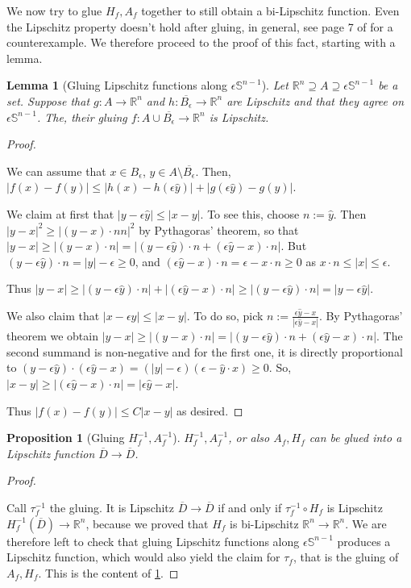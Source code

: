 \documentclass[english,a4paper,9pt,oneside]{scrbook}	%
\theoremstyle{break}
\newtheorem{lemma}[equation]{Lemma}
\newtheorem{prop}[equation]{Proposition}
\newenvironment{mproof}[1][\proofname]{%
  \begin{proof}[#1]$ $\par\nobreak\ignorespaces
}{%
  \end{proof}
}
\renewcommand*{\proofname}{Proof}
\theoremstyle{remark}
\newcommand{\mR}{\mathbb{R}}
\newcommand{\mS}{\mathbb{S}^{n-1}}
\newcommand{\yh}{\hat{y}}
\newcommand{\eps}{\epsilon}
\begin{document}
We now try to glue $H_f, A_f$ together to still obtain a bi-Lipschitz function. Even the Lipschitz property doesn't hold after gluing, in general, see page 7 of \cite{weaver} for a counterexample. We therefore proceed to the proof of this fact, starting with a lemma.

\begin{lemma}[Gluing Lipschitz functions along $\eps \mS$]
\label{lemma:gluing_lip}
Let $\mR^n \supseteq A\supseteq\eps \mS$ be a set. Suppose that $g:A\rightarrow\mR^n$ and $h:\overline{B_\eps}\rightarrow\mR^n$ are Lipschitz and that they agree on $\eps \mS$. The, their gluing $f: A \cup \overline{B_\eps}\rightarrow\mR^n$ is Lipschitz.
\end{lemma}

\begin{mproof}
We can assume that $x \in B_\eps$, $y \in A \setminus \overline{B_\eps}$.
Then, $|f(x)-f(y)|\leq |h(x)-h(\eps \yh)|+|g(\eps \yh)-g(y)|$.

We claim at first that $|y-\eps \yh|\leq  |x-y|$. To see this, choose $n:=\yh$. Then $|y-x|^2 \geq |(y-x)\cdot n n|^2$ by Pythagoras' theorem, so that $|y-x|\geq |(y-x)\cdot n| = |(y-\eps \yh)\cdot n + (\eps \yh -x)\cdot n|$. But $(y-\eps \yh)\cdot n=|y|-\eps \geq 0$, and $(\eps \yh -x)\cdot n = \eps - x\cdot n\geq 0 $ as $x\cdot n \leq |x|\leq \eps$.

Thus  $|y-x|\geq |(y-\eps \yh)\cdot n| + |(\eps \yh -x)\cdot n|\geq  |(y-\eps \yh)\cdot n|=|y-\eps \yh|$.

We also claim that $|x-\eps \yh|\leq |x-y|$. To do so, pick $n:=\frac{\eps\yh -x}{|\eps\yh-x|}$. By Pythagoras' theorem we obtain $|y-x|\geq |(y-x)\cdot n|=|(y-\eps \yh)\cdot n +(\eps \yh -x)\cdot n|$. The second summand is non-negative and for the first one, it is directly proportional to $(y-\eps \yh)\cdot(\eps \yh-x)=(|y|-\eps)(\eps-\yh\cdot x)\geq 0$. So, $|x-y|\geq |(\eps \yh -x)\cdot n|=|\eps \yh -x|$.

Thus $ |f(x)-f(y)|\leq C|x-y|$ as desired.
\end{mproof}

\begin{prop}[Gluing $H_f^{-1}, A_f^{-1}$]
\label{prop:gluing}
$H_f^{-1}, A_f^{-1}$, or also $A_f, H_f$ can be glued into a Lipschitz function $\overline{D}\rightarrow\overline{D}$.
\end{prop}
\begin{mproof}

Call $\tau_f^{-1}$ the gluing. It is Lipschitz $\overline{D}\rightarrow\overline{D}$ if and only if $\tau_f^{-1}\circ H_f$ is Lipschitz $H_f^{-1}(\overline{D})\rightarrow\mR^n$, because we proved that $H_f$ is bi-Lipschitz $\mR^n \rightarrow \mR^n$.
We are therefore left to check that gluing Lipschitz functions along $\eps \mS$ produces a Lipschitz function, which would also yield the claim for $\tau_f$, that is the gluing of $A_f, H_f$. This is the content of \cref{lemma:gluing_lip}.
\end{mproof}
\end{document}
